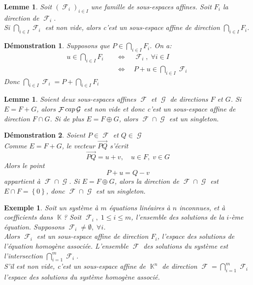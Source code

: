 \documentclass[a4paper, oneside]{report}
\theoremstyle{break}
\newtheorem{lemme}[thm]{Lemme}
\newtheorem{exemple}[thm]{Exemple}
\newtheorem*{demonstration}{Démonstration}
\DeclareMathOperator{\K}{\mathbb{K}}
\DeclareMathOperator{\F}{\mathcal{F}}
\DeclareMathOperator{\G}{\mathcal{G}}
\DeclarePairedDelimiter\ens{\left\{ }{\right\} }%
\renewcommand{\ens}[1]{\left\{ #1 \right\} }%
\newcommand{\ensF}{\F}
\newcommand{\ensG}{\G}
\begin{document}
\begin{lemme}
Soit $(\ensF_i)_{i \in I}$ une famille de sous-espaces affines. Soit $F_i$ la direction de $\ensF_i$.\\
Si $\bigcap\limits_{i \in I} \ensF_i$ est non vide, alors c'est un sous-espace affine de direction $\bigcap\limits_{i \in I} F_i$.
\end{lemme}

\begin{demonstration}
Supposons que $P \in \bigcap\limits_{i \in I} F_i$. On a:
\begin{align*}
u \in \bigcap_{i \in I} F_i 	\quad	&\Leftrightarrow	\quad	\ensF_i, \; \forall i \in I
\\
&\Leftrightarrow	\quad	P + u \in \bigcap_{i \in I} \ensF_i
\end{align*}
Donc $\bigcap\limits_{i \in I} \ensF_i = P + \bigcap\limits_{i \in I} F_i$
\end{demonstration}

\begin{lemme}
Soient deux sous-espaces affines $\ensF$ et $\ensG$ de directions $F$ et $G$. Si $E = F  + G$, alors $\ensF \\cap \ensG$ est non vide et donc c'est un sous-espace affine de direction $F \cap G$. Si de plus $E = F \oplus G$, alors $\ensF \cap \ensG$ est un singleton.
\end{lemme}

\begin{demonstration}
Soient $P \in \ensF$ et $Q \in \ensG$\\
Comme $E = F + G$, le vecteur $\vec{PQ}$ s'écrit
\[
\vec{PQ} = u + v,		\quad	u \in F, \; v \in G
\]
Alors le point
\[
P + u = Q - v
\]
appartient à $\ensF \cap \ensG$. Si $E = F \oplus G$, alors la direction de $\ensF \cap \ensG$ est $E \cap F = \ens{0}$, donc $\ensF \cap \ensG$ est un singleton.
\end{demonstration}

\begin{exemple}
Soit un système à $m$ équations linéaires à $n$ inconnues, et à coefficients dans $\K$? Soit $\ensF_i, \; 1 \leq i \leq m$, l'ensemble des solutions de la $i$-ème équation. Supposons $\ensF_i \neq \emptyset, \; \forall i$.\\
Alors $\ensF_i$ est un sous-espace affine de direction $F_i$, l'espace des solutions de l'équation homogène associée. L'ensemble $\ensF$ des solutions du système est l'intersection $\bigcap_{i = 1}^m \ensF_i$.\\
S'il est non vide, c'est un sous-espace affine de $\K^n$ de direction $\ensF = \bigcap_{i = 1}^m \ensF_i$ l'espace des solutions du système homogène associé.
\end{exemple}
\end{document}
